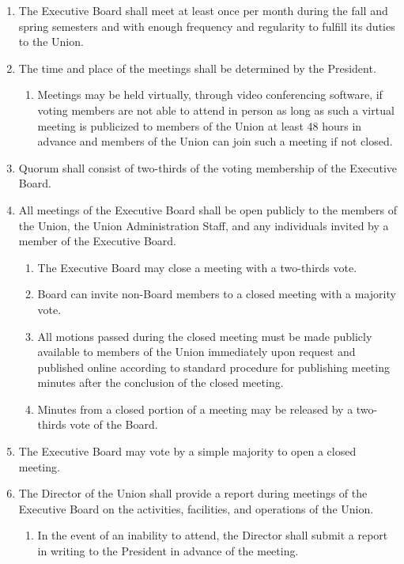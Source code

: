 \documentclass{uniondoc}
\begin{document}

\begin{enumerate}
\item The Executive Board shall meet at least once per month during the fall and spring semesters and with enough frequency and regularity to fulfill its duties to the Union.
\item The time and place of the meetings shall be determined by the President.
  \begin{enumerate}
  \item Meetings may be held virtually, through video conferencing software, if voting members are not able to attend in person as long as such a virtual meeting is publicized to members of the Union at least 48 hours in advance and members of the Union can join such a meeting if not closed.
  \end{enumerate}
\item Quorum shall consist of two-thirds of the voting membership of the Executive Board.
\item All meetings of the Executive Board shall be open publicly to the members of the Union, the Union Administration Staff, and any individuals invited by a member of the Executive Board.
  \begin{enumerate}
  \item The Executive Board may close a meeting with a two-thirds vote.
  \item Board can invite non-Board members to a closed meeting with a majority vote.
  \item All motions passed during the closed meeting must be made publicly available to members of the Union immediately upon request and published online according to standard procedure for publishing meeting minutes after the conclusion of the closed meeting.
  \item Minutes from a closed portion of a meeting may be released by a two-thirds vote of the Board.
  \end{enumerate}
\item The Executive Board may vote by a simple majority to open a closed meeting.
\item The Director of the Union shall provide a report during meetings of the Executive Board on the activities, facilities, and operations of the Union.
  \begin{enumerate}
  \item In the event of an inability to attend, the Director shall submit a report in writing to the President in advance of the meeting.

\end{enumerate}
\end{enumerate}
\end{document}
